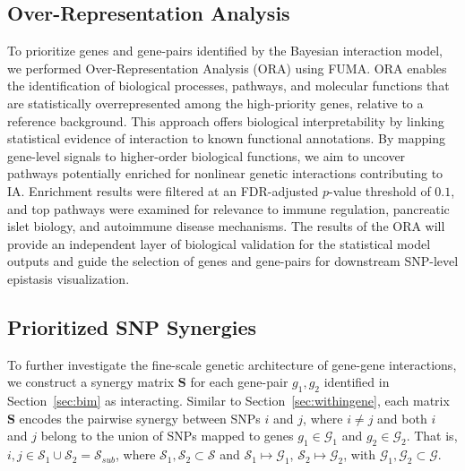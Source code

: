 \documentclass{article}\usepackage[]{graphicx}\usepackage[]{color}
\begin{document}
\subsection{Over-Representation Analysis}
To prioritize genes and gene-pairs identified by the Bayesian interaction model, we performed Over-Representation Analysis (ORA) using FUMA\cite{watanabeFunctionalMappingAnnotation2017}. ORA enables the identification of biological processes, pathways, and molecular functions that are statistically overrepresented among the high-priority genes, relative to a reference background. This approach offers biological interpretability by linking statistical evidence of interaction to known functional annotations. By mapping gene-level signals to higher-order biological functions, we aim to uncover pathways potentially enriched for nonlinear genetic interactions contributing to IA. Enrichment results were filtered at an FDR-adjusted $p$-value threshold of $0.1$, and top pathways were examined for relevance to immune regulation, pancreatic islet biology, and autoimmune disease mechanisms. The results of the ORA will provide an independent layer of biological validation for the statistical model outputs and guide the selection of genes and gene-pairs for downstream SNP-level epistasis visualization.

\subsection{Prioritized SNP Synergies}
\label{sec:gpair-syn}
To further investigate the fine-scale genetic architecture of gene-gene interactions, we construct a synergy matrix $\mathbf{S}$ for each gene-pair ${g_1, g_2}$ identified in Section~\ref{sec:bim} as interacting. Similar to Section~\ref{sec:withingene}, each matrix $\mathbf{S}$ encodes the pairwise synergy between SNPs $i$ and $j$, where $i \ne j$ and both $i$ and $j$ belong to the union of SNPs mapped to genes $g_1 \in \mathcal{G}_1$ and $g_2 \in \mathcal{G}_2$. That is, $i,j \in \mathcal{S}_1 \cup \mathcal{S}_2 = \mathcal{S}_{sub}$, where $\mathcal{S}_1, \mathcal{S}_2 \subset \mathcal{S}$ and $\mathcal{S}_1 \mapsto \mathcal{G}_1$, $\mathcal{S}_2 \mapsto \mathcal{G}_2$, with $\mathcal{G}_1, \mathcal{G}_2 \subset \mathcal{G}$.
\end{document}
